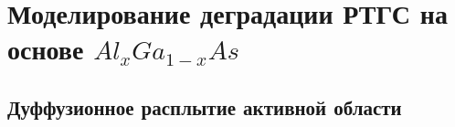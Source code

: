 \chapter{Моделирование деградации РТГС на основе $Al_{x}Ga_{1−x}As$}
\section{Дуффузионное расплытие активной области}